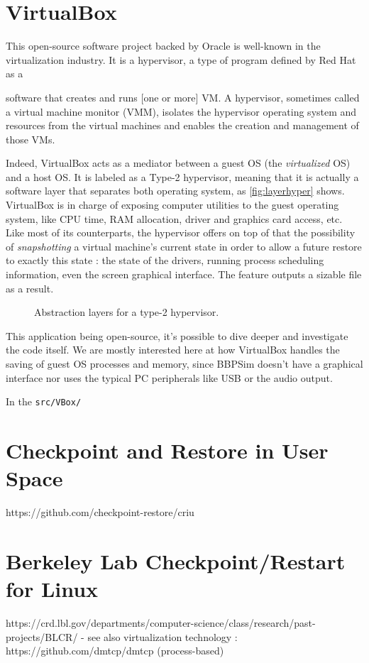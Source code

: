{\section{VirtualBox}\label{sec:virtualbox}
This open-source software project backed by Oracle is well-known in the virtualization industry. It is a hypervisor, a type of program defined by Red Hat as a
\begin{shadedquotation}
	[...] software that creates and runs [one or more] \gls{VM}. A hypervisor, sometimes called a virtual machine monitor (VMM), isolates the hypervisor operating system and resources from the virtual machines and enables the creation and management of those VMs.\cite{online:redhat}
\end{shadedquotation}
Indeed, VirtualBox acts as a mediator between a guest OS (the \textit{virtualized} OS) and a host OS. It is labeled as a Type-2 hypervisor, meaning that it is actually a software layer that separates both operating system, as \autoref{fig:layerhyper} shows. VirtualBox is in charge of exposing computer utilities to the guest operating system, like CPU time, RAM allocation, driver and graphics card access, etc. Like most of its counterparts, the hypervisor offers on top of that the possibility of \textit{snapshotting} a virtual machine's current state in order to allow a future restore to exactly this state : the state of the drivers, running process scheduling information, even the screen graphical interface. The feature outputs a sizable file as a result.

\begin{wrapfigure}{r}{0.35\textwidth}
	\centering \scriptsize
	\vspace{-12pt}
	
	\caption{Abstraction layers for a type-2 hypervisor.}
	\label{fig:layerhyper}
\end{wrapfigure}
This application being open-source, it's possible to dive deeper and investigate the code itself. We are mostly interested here at how VirtualBox handles the saving of guest OS processes and memory, since BBPSim doesn't have a graphical interface nor uses the typical PC peripherals like USB or the audio output.

In the \texttt{src/VBox/}

\section{Checkpoint and Restore in User Space}\label{sec:criu}
https://github.com/checkpoint-restore/criu
\section{Berkeley Lab Checkpoint/Restart for Linux}\label{sec:blcr}
https://crd.lbl.gov/departments/computer-science/class/research/past-projects/BLCR/
- see also virtualization technology : https://github.com/dmtcp/dmtcp (process-based)



}